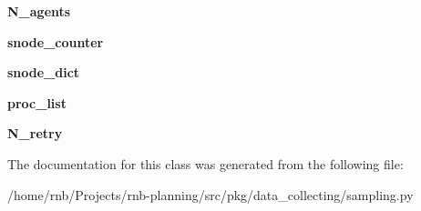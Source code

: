\begin{DoxyCompactItemize}
{\bfseries N\+\_\+agents}
\item 
\mbox{\label{classrnb-planning_1_1src_1_1pkg_1_1data__collecting_1_1sampling_1_1_data_collector_abb470ba252c3c693fa41ad99ea4434f8}} 
{\bfseries snode\+\_\+counter}
\item 
\mbox{\label{classrnb-planning_1_1src_1_1pkg_1_1data__collecting_1_1sampling_1_1_data_collector_a9c3b6c3e25e8ef417b37a6e0a091ec6b}} 
{\bfseries snode\+\_\+dict}
\item 
\mbox{\label{classrnb-planning_1_1src_1_1pkg_1_1data__collecting_1_1sampling_1_1_data_collector_aa404a6bc545ed063b34d50cc7b8aa1e2}} 
{\bfseries proc\+\_\+list}
\item 
\mbox{\label{classrnb-planning_1_1src_1_1pkg_1_1data__collecting_1_1sampling_1_1_data_collector_ab7e0f44d1133812b5a4f39a66a70890f}} 
{\bfseries N\+\_\+retry}
\end{DoxyCompactItemize}


The documentation for this class was generated from the following file\+:\begin{DoxyCompactItemize}
\item 
/home/rnb/\+Projects/rnb-\/planning/src/pkg/data\+\_\+collecting/sampling.\+py\end{DoxyCompactItemize}
